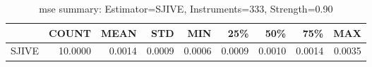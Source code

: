 \begin{table}[ht]
\centering
\caption{mse summary: Estimator=SJIVE, Instruments=333, Strength=0.90}
\begin{tabular}{lrrrrrrrr}
\toprule
 & COUNT & MEAN & STD & MIN & 25\% & 50\% & 75\% & MAX \\
\midrule
SJIVE & 10.0000 & 0.0014 & 0.0009 & 0.0006 & 0.0009 & 0.0010 & 0.0014 & 0.0035 \\
\bottomrule
\end{tabular}
\end{table}

